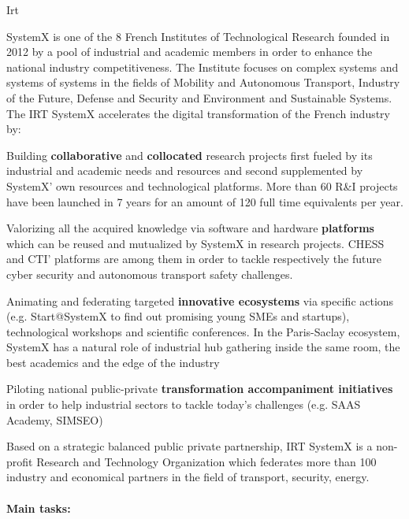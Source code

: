 \begin{sitedescription}{Irt}




SystemX is one of the 8 French Institutes of Technological Research founded in 2012 by a pool of industrial and academic members in order to enhance the national industry competitiveness. The Institute focuses on complex systems and systems of systems in the fields of Mobility and Autonomous Transport, Industry of the Future, Defense and Security and Environment and Sustainable Systems. The IRT SystemX accelerates the digital transformation of the French industry by:

\begin{compactitem}
\item Building {\bf collaborative} and {\bf collocated} research projects first fueled by its industrial and academic needs and resources and second supplemented by SystemX’ own resources and technological platforms. More than 60 R\&I projects have been launched in 7 years for an amount of 120 full time equivalents per year.
\item Valorizing all the acquired knowledge via software and hardware {\bf platforms} which can be reused and mutualized by SystemX in research projects. CHESS and CTI’ platforms are among them in order to tackle respectively the future cyber security and autonomous transport safety challenges.
\item Animating and federating targeted {\bf innovative ecosystems} via specific actions (e.g. Start@SystemX to find out promising young SMEs and startups), technological workshops and scientific conferences. In the Paris-Saclay ecosystem, SystemX has a natural role of industrial hub gathering inside the same room, the best academics and the edge of the industry
\item Piloting national public-private {\bf transformation accompaniment initiatives} in order to help industrial sectors to tackle today’s challenges (e.g. SAAS Academy, SIMSEO)
\end{compactitem}

Based on a strategic balanced public private partnership, IRT SystemX is a non-profit Research and Technology Organization which federates more than 100 industry and economical partners in the field of transport, security, energy.



\paragraph*{Main tasks:}


\end{sitedescription}
